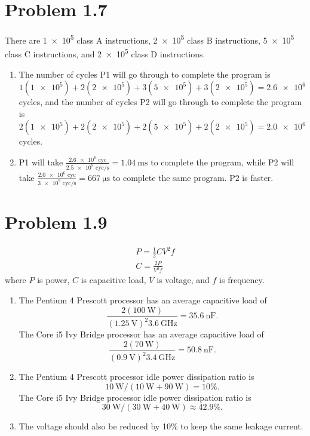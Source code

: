 \documentclass{article}
\begin{document}
\section*{Problem 1.7}
There are \num{1e5} class A instructions,
\num{2e5} class B instructions, \num{5e5} class C instructions,
and \num{2e5} class D instructions.
\begin{enumerate}
    \item The number of cycles P1 will go through to complete
    the program is
    \(1(\num{1e5}) + 2(\num{2e5}) + 3(\num{5e5}) + 3(\num{2e5}) = \num{2.6e6}\)
    cycles,
    and the number of cycles P2 will go through to
    complete the program is
    \(2(\num{1e5}) + 2(\num{2e5}) + 2(\num{5e5}) + 2(\num{2e5}) = \num{2.0e6}\)
    cycles.
    \item P1 will take \(\frac{\num{2.6e6}\text{ cyc}}{\num{2.5e9}\text{ cyc/s}} = \SI{1.04}{\milli\second}\)
    to complete the program, while P2 will take
    \(\frac{\num{2.0e6}\text{ cyc}}{\num{3e9}\text{ cyc/s}} = \SI{667}{\micro\second}\)
    to complete the same program. P2 is faster.
\end{enumerate}

\section*{Problem 1.9}
\begin{gather*}
    P = \frac{1}{2} C V^2 f\\
    C = \frac{2P}{V^2f}
\end{gather*} where \(P\) is power, \(C\) is capacitive load,
\(V\) is voltage, and \(f\) is frequency.
\begin{enumerate}
    \item The Pentium 4 Prescott processor has an average
    capacitive load of
    \begin{equation*}
        \frac{2(\SI{100}{\watt})}{(\SI{1.25}{\volt})^2\SI{3.6}{\giga\hertz}}
        = \SI{35.6}{\nano\farad}.
    \end{equation*}
    The Core i5 Ivy Bridge processor has an average capacitive load of
    \begin{equation*}
        \frac{2(\SI{70}{\watt})}{(\SI{0.9}{\volt})^2 \SI{3.4}{\giga\hertz}}
        = \SI{50.8}{\nano\farad}.
    \end{equation*}
    \item The Pentium 4 Prescott processor idle power dissipation ratio
    is
    \begin{equation*}
        \SI{10}{\watt}/(\SI{10}{\watt} + \SI{90}{\watt}) = 10\%.
    \end{equation*}
    The Core i5 Ivy Bridge processor idle power dissipation ratio
    is
    \begin{equation*}
        \SI{30}{\watt}/(\SI{30}{\watt} + \SI{40}{\watt}) \approx 42.9\%.
    \end{equation*}
    \item The voltage should also be reduced by 10\% to keep the
    same leakage current.
\end{enumerate}
\end{document}
